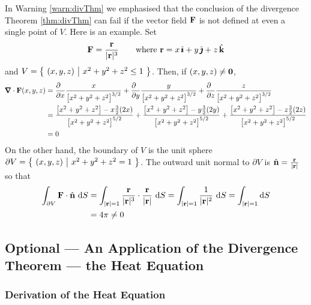 \begin{eg}\label{eg:divThmD}
In Warning \ref{warn:divThm} we emphasised that the conclusion of the
divergence Theorem \ref{thm:divThm} can fail if
the vector field $\mathbf{F}$ is not defined at even a single
point of $V$. Here is an example. Set
\begin{equation*}
\mathbf{F} = \frac{\mathbf{r}}{|\mathbf{r}|^3}
\qquad\text{where $\mathbf{r}=x\,\hat{\pmb{\imath}}+y\,\hat{\pmb{\jmath}} +z\,\hat{\mathbf{k}}$}
\end{equation*}
and $V=\big\{ \ (x,y,z)\ \big|\ x^2+y^2+z^2\le 1\ \big\}$.
Then, if $(x,y,z)\ne\mathbf{0}$,
\begin{align*}
\vnabla\cdot\vF(x,y,z)
&=\frac{\partial\hfill}{\partial x}\frac{x}{{\big[x^2+y^2+z^2\big]}^{3/2}}
+\frac{\partial\hfill}{\partial y}\frac{y}{{\big[x^2+y^2+z^2\big]}^{3/2}}
+\frac{\partial\hfill}{\partial z}\frac{z}{{\big[x^2+y^2+z^2\big]}^{3/2}}
\\
&=\frac{\big[x^2+y^2+z^2\big]-x\frac{3}{2}(2x)}{{\big[x^2+y^2+z^2\big]}^{5/2}}
+\frac{\big[x^2+y^2+z^2\big]-y\frac{3}{2}(2y)}{{\big[x^2+y^2+z^2\big]}^{5/2}}
+\frac{\big[x^2+y^2+z^2\big]-z\frac{3}{2}(2z)}{{\big[x^2+y^2+z^2\big]}^{5/2}}
\\
&=0
\end{align*}
On the other hand, the boundary of $V$ is the unit sphere
$\partial V = \big\{ \ (x,y,z)\ \big|\ x^2+y^2+z^2 = 1\ \big\}$. The outward unit 
normal to $\partial V$
is $\hat{\mathbf{n}} = \frac{\mathbf{r}}{|\mathbf{r}|}$ so that
\begin{align*}
\int_{\partial V}\vF\cdot\hn\ \dee{S}
&=\int_{|\vr|=1}  \frac{\vr}{|\vr|^3}\cdot \frac{\vr}{|\vr|}\ \dee{S} 
=\int_{|\vr|=1}  \frac{1}{|\vr|^2}\ \dee{S}
=\int_{|\vr|=1}\dee{S} \\
&=4\pi\ne 0
\end{align*}


\end{eg}



\subsection{Optional --- An Application of the Divergence Theorem --- the Heat Equation}  \label{sec:heatEqn}

\subsubsection{Derivation of the Heat Equation}

